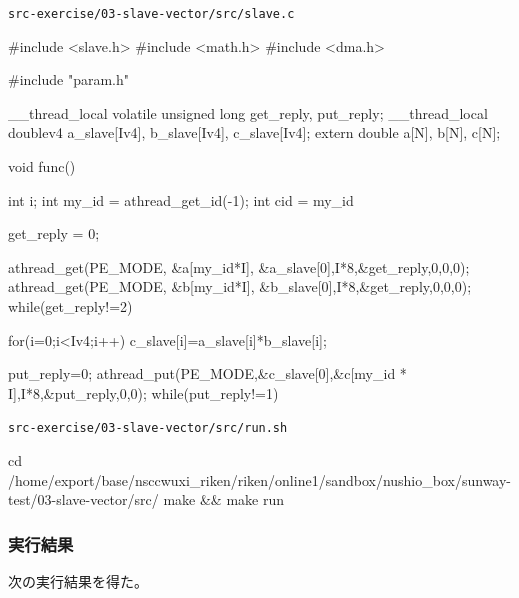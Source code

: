 \verb`src-exercise/03-slave-vector/src/slave.c`
\begin{code}
#include <slave.h>
#include <math.h>
#include <dma.h>

#include "param.h"

__thread_local volatile unsigned long get_reply, put_reply;
__thread_local doublev4 a_slave[Iv4], b_slave[Iv4], c_slave[Iv4];
extern double a[N], b[N], c[N];

void func() {
  int i;
  int my_id = athread_get_id(-1);
  int cid = my_id%

  get_reply = 0;

  athread_get(PE_MODE, &a[my_id*I], &a_slave[0],I*8,&get_reply,0,0,0);
  athread_get(PE_MODE, &b[my_id*I], &b_slave[0],I*8,&get_reply,0,0,0);
  while(get_reply!=2) {}

  for(i=0;i<Iv4;i++){
    c_slave[i]=a_slave[i]*b_slave[i];
  }

  put_reply=0;
  athread_put(PE_MODE,&c_slave[0],&c[my_id * I],I*8,&put_reply,0,0);
  while(put_reply!=1) {}

}

\end{code}

\verb`src-exercise/03-slave-vector/src/run.sh`
\begin{code}

cd /home/export/base/nsccwuxi_riken/riken/online1/sandbox/nushio_box/sunway-test/03-slave-vector/src/
make && make run
    
\end{code}

\subsubsection{実行結果}

次の実行結果を得た。

